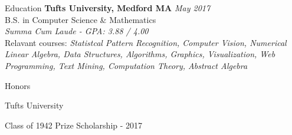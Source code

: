 \documentclass{resume}
\begin{document}
  \begin{rSection}{Education}
    {\bf Tufts University, Medford MA} \hfill {\em May 2017} \\ 
    { B.S. in Computer Science \& Mathematics } \\
    \textit{Summa Cum Laude -  GPA: 3.88 / 4.00}\\
    Relavant courses: 
    \textit{Statistcal Pattern Recognition, Computer Vision, Numerical Linear Algebra, Data Structures, Algorithms, Graphics, Visualization, Web Programming, Text Mining, Computation Theory, Abstract Algebra}
  \end{rSection}
  \begin{rSection}{Honors}
  \begin{rSubsection}{Tufts University}{}{}{}
  \item Class of 1942 Prize Scholarship - 2017
  \end{rSubsection}
  \end{rSection}
\end{document}
